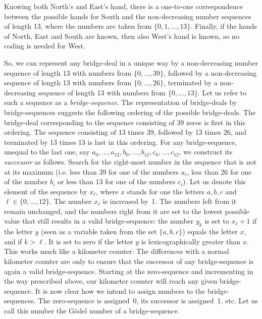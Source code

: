 Knowing both North's and East's hand, there is a one-to-one
correspondence between the possible hands for South and the
non-decreasing number sequences of length 13, where the
numbers are taken from $\{0,1,\ldots,13\}$. Finally, if the
hands of North, East and South are known, then also
West's hand is known, so no coding is needed for West.

So, we can represent any bridge-deal in a unique way by a
non-decreasing number sequence of length 13 with numbers
from $\{0,\ldots,39\}$, followed by a non-decreasing sequence
of length 13 with numbers from $\{0,\ldots,26\}$, terminated
by a non-decreasing sequence of length 13 with numbers from
$\{0,\ldots,13\}$. Let us refer to such a sequence as a
{\it bridge-sequence}. The representation of bridge-deals
by bridge-sequences suggests the following ordering of the
possible bridge-deals. The bridge-deal corresponding to the
sequence consisting of 39 zeros is first in this ordering.
The sequence consisting of 13 times 39, followed by 13 times
26, and terminated by 13 times 13 is last in this ordering.
For any bridge-sequence, unequal to the last one, say
$a_0,\ldots,a_{12},b_0,\ldots,b_{12},c_0,\ldots,c_{12}$,
we construct its {\it successor} as follows. Search for the
right-most number in the sequence that is not at its maximum
(i.e. less than 39 for one of the numbers $a_i$, less than
26 for one of the number $b_i$ or less than 13 for one of
the numbers $c_i$). Let us denote this element of the sequence
by $x_\ell$, where $x$ stands for one the letters $a,b,c$ and
$\ell\in \{0,\ldots,12\}$. The number $x_\ell$ is increased
by~1. The numbers left from it remain unchanged, and the numbers
right from it are set to the lowest possible value that still
results in a valid bridge-sequence: the number $y_k$ is set
to $x_\ell + 1$ if the letter $y$ (seen as a variable taken from
the set $\{a,b,c\}$) equals the letter $x$, and if $k>\ell$. It
is set to zero if the letter $y$ is lexicographically greater than
$x$. This works much like a kilometer counter. The differences
with a normal kilometer counter are only to ensure that the
successor of any bridge-sequence is again a valid bridge-sequence.
Starting at the zero-sequence and incrementing in the way prescribed
above, our kilometer counter will reach any given bridge-sequence.
It is now clear how we intend to assign numbers to the bridge-sequences.
The zero-sequence is assigned~0, its successor is assigned~1, etc. Let
us call this number the G\"odel number of a bridge-sequence.

